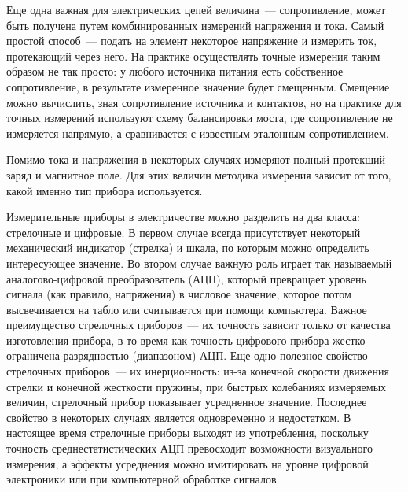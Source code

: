 Еще одна важная для электрических цепей величина~--- сопротивление, может быть
получена путем комбинированных измерений напряжения и тока. Самый простой
способ~--- подать на элемент некоторое напряжение и измерить ток, протекающий
через него. 
На практике осуществлять точные измерения таким образом не так
просто: у любого источника питания есть собственное сопротивление, в результате
измеренное значение будет смещенным. 
Смещение можно вычислить, зная
сопротивление источника и контактов, но на практике для точных измерений
используют схему балансировки моста, где сопротивление не измеряется напрямую, а
сравнивается с известным эталонным сопротивлением.

Помимо тока и напряжения в некоторых случаях измеряют полный протекший заряд и
магнитное поле. Для этих величин методика измерения зависит от того, какой
именно тип прибора используется.

Измерительные приборы в электричестве можно разделить на два класса: стрелочные
и цифровые. В первом случае всегда присутствует некоторый механический индикатор
(стрелка) и шкала, по которым можно определить интересующее значение.  Во втором
случае важную роль играет так называемый аналогово-цифровой преобразователь
(АЦП), который превращает уровень сигнала (как правило, напряжения) в числовое
значение, которое потом высвечивается на табло или считывается при помощи
компьютера. Важное преимущество стрелочных приборов~--- их точность зависит
только от качества изготовления прибора, в то время как точность цифрового
прибора жестко ограничена разрядностью (диапазоном) АЦП. Еще одно полезное
свойство стрелочных приборов~--- их инерционность: из-за конечной скорости
движения стрелки и конечной жесткости пружины, при быстрых колебаниях измеряемых
величин, стрелочный прибор показывает усредненное значение. Последнее свойство в
некоторых случаях является одновременно и недостатком. В настоящее время
стрелочные приборы выходят из употребления, поскольку точность
среднестатистических АЦП превосходит возможности визуального измерения, а
эффекты усреднения можно имитировать на уровне цифровой электроники или при
компьютерной обработке сигналов.


